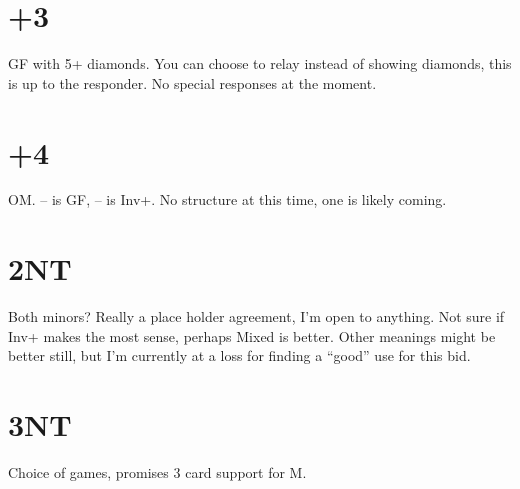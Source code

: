 \documentclass[tom-ari]{subfile}
\begin{document}
	\section{+3}
	
	GF with 5+ diamonds.  You can choose to relay instead of showing diamonds, this is up to the responder.  No special responses at the moment.
	
	\section{+4}
	
	OM.  -- is GF, -- is Inv+.  No structure at this time, one is likely coming.
	
	\section{2NT}
	
	Both minors?  Really a place holder agreement, I'm open to anything.  Not sure if Inv+ makes the most sense, perhaps Mixed is better.  Other meanings might be better still, but I'm currently at a loss for finding a ``good'' use for this bid.
	
	\section{3NT}
	
	Choice of games, promises 3 card support for M.
		
\end{document}
